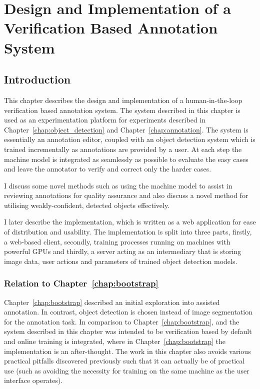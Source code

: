 \chapter{Design and Implementation of a Verification Based Annotation System}
\label{chap:design} 

\section{Introduction}

This chapter describes the design and implementation of a human-in-the-loop verification based annotation system. The system described in this chapter is used as an experimentation platform for experiments described in Chapter~\ref{chap:object_detection} and Chapter~\ref{chap:annotation}. The system is essentially an annotation editor, coupled with an object detection system which is trained incrementally as annotations are provided by a user. At each step the machine model is integrated as seamlessly as possible to evaluate the easy cases and leave the annotator to verify and correct only the harder cases. 

I discuss some novel methods such as using the machine model to assist in reviewing annotations for quality assurance and also discuss a novel method for utilising weakly-confident, detected objects effectively.

I later describe the implementation, which is written as a web application for ease of distribution and usability. The implementation is split into three parts, firstly, a web-based client, secondly, training processes running on machines with powerful \gls{GPU}s and thirdly, a server acting as an intermediary that is storing image data, user actions and parameters of trained object detection models.

\subsection {Relation to Chapter~\ref{chap:bootstrap}}

Chapter~\ref{chap:bootstrap} described an initial exploration into assisted annotation. In contrast, object detection is chosen instead of image segmentation for the annotation task. In comparison to Chapter~\ref{chap:bootstrap}, and the system described in this chapter was intended to be verification based by default and online training is integrated, where in Chapter~\ref{chap:bootstrap} the implementation is an after-thought. The work in this chapter also avoids various practical pitfalls discovered previously such that it can actually be of practical use (such as avoiding the necessity for training on the same machine as the user interface operates).

